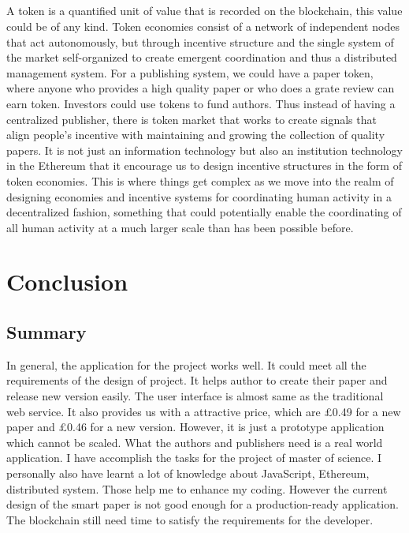 \documentclass[openany,12pt]{ecsthesis}      %
\begin{document}
\paragraph{}
A token is a quantified unit of value that is recorded on the blockchain, this value could be of any kind.
Token economies consist of a network of independent nodes that act autonomously, 
but through incentive structure and the single system of the market self-organized to create emergent coordination 
and thus a distributed management system. For a publishing system, we could have a paper token, where anyone who provides a high quality paper or who does a grate review can earn token.
Investors could use tokens to fund authors. Thus instead of having a centralized publisher, 
there is token market that works to create signals 
that align people's incentive with maintaining and growing the collection of quality papers.
It is not just an information technology but also an institution technology in the Ethereum that it encourage us to design incentive structures in the form of token economies. 
This is where things get complex 
as we move into the realm of designing economies and incentive systems for 
coordinating human activity in a decentralized fashion, 
something that could potentially enable the coordinating of all human activity at a much larger scale than has been possible before.
\chapter{Conclusion}
\section{Summary}
In general, the application for the project works well. It could meet all the requirements of the design of project. 
It helps author to create their paper and release new version easily. 
The user interface is almost same as the traditional web service. 
It also provides us with a attractive price, 
which are £0.49 for a new paper and £0.46 for a new version.
However, it is just a prototype application which cannot be scaled.
What the authors and publishers need is a real world application. 
I have accomplish the tasks for the project of master of science. 
I personally also have learnt a lot of knowledge about JavaScript, Ethereum, distributed system. 
Those help me to enhance my coding.
However the current design of the smart paper is not good enough for a production-ready application.
The blockchain still need time to satisfy the requirements for the developer.
\end{document}
